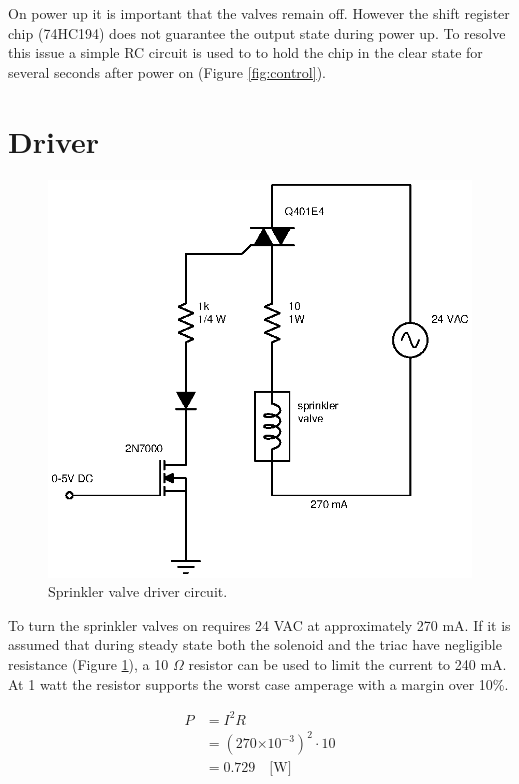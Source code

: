 \documentclass{article}
\providecommand{\e}[1]{\ensuremath{\times 10^{#1}}}
\begin{document}
On power up it is important that the valves remain off.
However the shift register chip (74HC194) does not guarantee
the output state during power up.
To resolve this issue a simple RC circuit is used to to hold the
chip in the clear state for several seconds after power
on (Figure \ref{fig:control}).


\clearpage
\section{Driver}
\label{sec:driver}

\begin{figure}[hbp]
\centering
\includegraphics[scale=0.8]{xcircuit/driver}
\caption{Sprinkler valve driver circuit.}\label{fig:driver}
\end{figure}

To turn the sprinkler valves on requires 24 VAC at approximately 270 mA.
If it is assumed that during steady state both the solenoid
and the triac have negligible resistance (Figure \ref{fig:driver}),
a 10 $\Omega$ resistor can be used to limit the current to 240 mA.
At 1 watt the resistor supports the worst case amperage with a margin
over 10\%.

\begin{align*}
	P &= I^2 R \\
	  &= (270\e{-3})^2 \cdot 10 \\
	  &= 0.729 \quad \text{[W]}
\end{align*}
\end{document}
